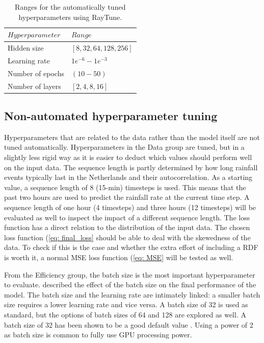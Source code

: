 \documentclass[twocolumn, 10pt, a4paper]{memoir}
\begin{document}
	\begin{table}
		\caption{Ranges for the automatically tuned hyperparameters using RayTune.}
		\label{tab: raytunetable}
		\centering
		\renewcommand{\arraystretch}{1.5}
		\begin{tabular}{P{2.5cm}P{4.2cm}}
			\hline
			$Hyperparameter$&$Range$\\
			\hline
			Hidden size&$[8,32,64,128,256]$\\
			Learning rate&$1e^{-6} - 1e^{-3}$\\
			Number of epochs&$(10 - 50)$\\
			Number of layers&$[2,4,8,16]$\\
			\hline
		\end{tabular}
	\end{table}
	
	\subsection{Non-automated hyperparameter tuning} \label{sec: Nonauto tuning}
	Hyperparameters that are related to the data rather than the model itself are not tuned automatically. Hyperparameters in the Data group are tuned, but in a slightly less rigid way as it is easier to deduct which values should perform well on the input data.
	The sequence length is partly determined by how long rainfall events typically last in the Netherlands and their autocorrelation. As a starting value, a sequence length of 8 (15-min) timesteps is used. This means that the past two hours are used to predict the rainfall rate at the current time step. A sequence length of one hour (4 timesteps) and three hours (12 timesteps) will be evaluated as well to inspect the impact of a different sequence length.
	The loss function has a direct relation to the distribution of the input data. The chosen loss function (\ref{eq: final_loss} should be able to deal with the skewedness of the data. To check if this is the case and whether the extra effort of including a RDF is worth it, a normal MSE loss function (\ref{eq: MSE} will be tested as well.
	
	From the Efficiency group, the batch size is the most important hyperparameter to evaluate. described the effect of the batch size on the final performance of the model. The batch size and the learning rate are intimately linked: a smaller batch size requires a lower learning rate and vice versa. A batch size of 32 is used as standard, but the options of batch sizes of 64 and 128 are explored as well. A batch size of 32 has been shown to be a good default value \cite{Bengio2012}. Using a power of 2 as batch size is common to fully use GPU processing power.
	
\end{document}
